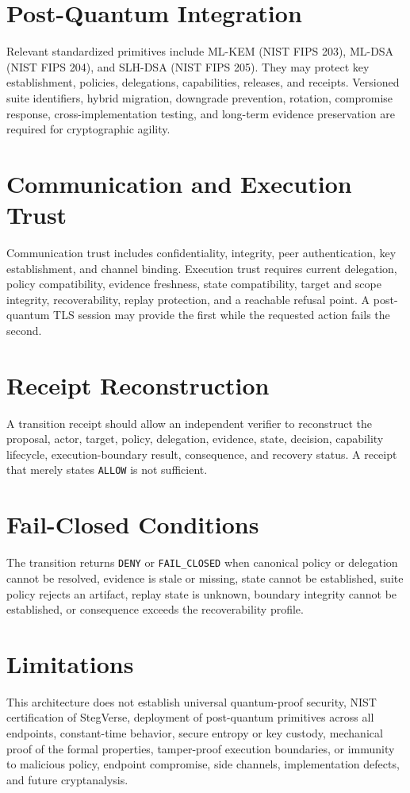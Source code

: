 \documentclass[11pt]{article}
\newcommand{\allow}{\texttt{ALLOW}}
\newcommand{\deny}{\texttt{DENY}}
\newcommand{\failclosed}{\texttt{FAIL\_CLOSED}}
\begin{document}
\section{Post-Quantum Integration}
Relevant standardized primitives include ML-KEM (NIST FIPS 203), ML-DSA (NIST FIPS 204), and SLH-DSA (NIST FIPS 205). They may protect key establishment, policies, delegations, capabilities, releases, and receipts. Versioned suite identifiers, hybrid migration, downgrade prevention, rotation, compromise response, cross-implementation testing, and long-term evidence preservation are required for cryptographic agility.

\section{Communication and Execution Trust}
Communication trust includes confidentiality, integrity, peer authentication, key establishment, and channel binding. Execution trust requires current delegation, policy compatibility, evidence freshness, state compatibility, target and scope integrity, recoverability, replay protection, and a reachable refusal point. A post-quantum TLS session may provide the first while the requested action fails the second.

\section{Receipt Reconstruction}
A transition receipt should allow an independent verifier to reconstruct the proposal, actor, target, policy, delegation, evidence, state, decision, capability lifecycle, execution-boundary result, consequence, and recovery status. A receipt that merely states \allow{} is not sufficient.

\section{Fail-Closed Conditions}
The transition returns \deny{} or \failclosed{} when canonical policy or delegation cannot be resolved, evidence is stale or missing, state cannot be established, suite policy rejects an artifact, replay state is unknown, boundary integrity cannot be established, or consequence exceeds the recoverability profile.

\section{Limitations}
This architecture does not establish universal quantum-proof security, NIST certification of StegVerse, deployment of post-quantum primitives across all endpoints, constant-time behavior, secure entropy or key custody, mechanical proof of the formal properties, tamper-proof execution boundaries, or immunity to malicious policy, endpoint compromise, side channels, implementation defects, and future cryptanalysis.
\end{document}
